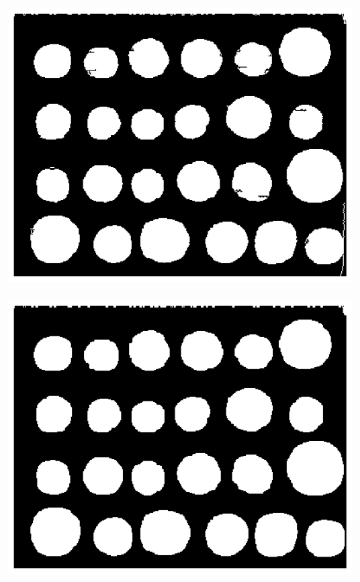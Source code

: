 \documentclass[11pt]{article}
\begin{document}
\begin{figure}[H]
    \begin{subfigure}{.33\textwidth}
        \centering
        \includegraphics[width=\linewidth]{figs/q1c_binary_hole_filled.png}
        \caption{}
    \end{subfigure}%
    \begin{subfigure}{.33\textwidth}
        \centering
        \includegraphics[width=\linewidth]{figs/q1c_median_filtered_mask.png}
        \caption{}
    \end{subfigure}%
    \begin{subfigure}{.33\textwidth}
        \centering

\end{subfigure}
\end{figure}
\end{document}
